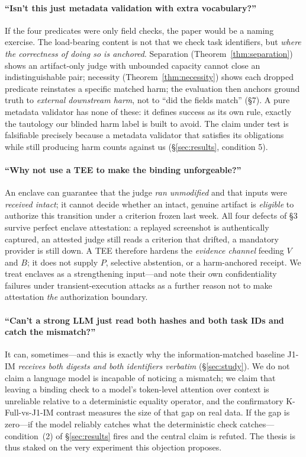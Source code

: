 \documentclass[sigconf,anonymous,review]{acmart}
\begin{document}
\paragraph{``Isn't this just metadata validation with extra vocabulary?''} If the four predicates were only field checks, the paper would be a naming exercise. The load-bearing content is not that we check task identifiers, but \emph{where the correctness of doing so is anchored}. Separation (Theorem~\ref{thm:separation}) shows an artifact-only judge with unbounded capacity cannot close an indistinguishable pair; necessity (Theorem~\ref{thm:necessity}) shows each dropped predicate reinstates a specific matched harm; the evaluation then anchors ground truth to \emph{external downstream harm}, not to ``did the fields match'' (\S7). A pure metadata validator has none of these: it defines success as its own rule, exactly the tautology our blinded harm label is built to avoid. The claim under test is falsifiable precisely because a metadata validator that satisfies its obligations while still producing harm counts against us (\S\ref{sec:results}, condition 5).

\paragraph{``Why not use a TEE to make the binding unforgeable?''} An enclave can guarantee that the judge \emph{ran unmodified} and that inputs were \emph{received intact}; it cannot decide whether an intact, genuine artifact is \emph{eligible} to authorize this transition under a criterion frozen last week. All four defects of \S3 survive perfect enclave attestation: a replayed screenshot is authentically captured, an attested judge still reads a criterion that drifted, a mandatory provider is still down. A TEE therefore hardens the \emph{evidence channel} feeding $V$ and $B$; it does not supply $P$, selective abstention, or a harm-anchored receipt. We treat enclaves as a strengthening input---and note their own confidentiality failures under transient-execution attacks \cite{vanbulck2018foreshadow} as a further reason not to make attestation \emph{the} authorization boundary.

\paragraph{``Can't a strong LLM just read both hashes and both task IDs and catch the mismatch?''} It can, sometimes---and this is exactly why the information-matched baseline J1-IM \emph{receives both digests and both identifiers verbatim} (\S\ref{sec:study}). We do not claim a language model is incapable of noticing a mismatch; we claim that leaving a binding check to a model's token-level attention over context is unreliable relative to a deterministic equality operator, and the confirmatory K-Full-vs-J1-IM contrast measures the size of that gap on real data. If the gap is zero---if the model reliably catches what the deterministic check catches---condition~(2) of \S\ref{sec:results} fires and the central claim is refuted. The thesis is thus staked on the very experiment this objection proposes.
\end{document}
